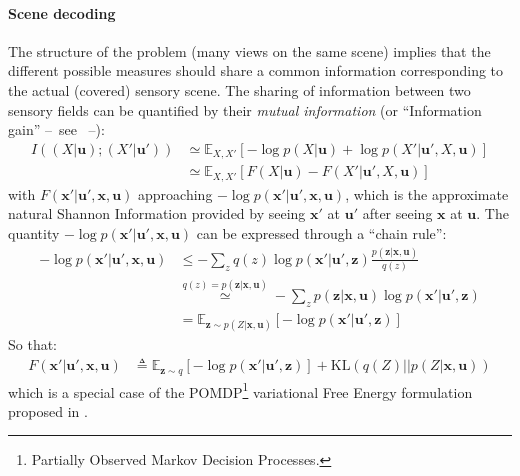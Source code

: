 \documentclass[12pt,twoside,openright]{article}
\begin{document}
\paragraph{Scene decoding}
The structure of the problem (many views on the same scene) implies that the different possible measures should share a common information corresponding to the actual (covered) sensory scene. The sharing of information between two sensory fields can be quantified by their \emph{mutual information} (or ``Information gain'' --~see \cite{tishby2011information}~--):
\begin{align}
I((X| \boldsymbol{u}); (X'| \boldsymbol{u}')) &\simeq \mathbb{E}_{X,X'} \left[-\log p(X| \boldsymbol{u}) + \log p(X'| \boldsymbol{u}', X, \boldsymbol{u})\right] \nonumber\\
&\simeq \mathbb{E}_{X,X'} \left[F(X|\boldsymbol{u}) - F(X'|\boldsymbol{u}', X, \boldsymbol{u})\right] 
\end{align}
with $F(\boldsymbol{x}'|\boldsymbol{u}', \boldsymbol{x}, \boldsymbol{u})$ approaching  $-\log p(\boldsymbol{x}'| \boldsymbol{u}', \boldsymbol{x}, \boldsymbol{u})$, which is the approximate natural Shannon Information provided by seeing $\boldsymbol{x}'$ at $\boldsymbol{u}'$ after seeing $\boldsymbol{x}$ at $\boldsymbol{u}$. The quantity $-\log p(\boldsymbol{x}'| \boldsymbol{u}', \boldsymbol{x}, \boldsymbol{u})$ can be expressed through a ``chain rule'': 
\begin{align}
-\log p(\boldsymbol{x}'| \boldsymbol{u}', \boldsymbol{x}, \boldsymbol{u}) 
&\leq - \sum_z q(z) \log p(\boldsymbol{x}'| \boldsymbol{u}', \boldsymbol{z}) \frac{p(\boldsymbol{z} |\boldsymbol{x}, \boldsymbol{u})} {q(z)}  \nonumber\\
&\stackrel{q(z) = p(\boldsymbol{z} |\boldsymbol{x}, \boldsymbol{u})}{\simeq} 
- \sum_z p(\boldsymbol{z} |\boldsymbol{x}, \boldsymbol{u}) \log p(\boldsymbol{x}'| \boldsymbol{u}', \boldsymbol{z})  \nonumber\\
&= \mathbb{E}_{\boldsymbol{z} \sim p(Z |\boldsymbol{x}, \boldsymbol{u})} \left[-\log p(\boldsymbol{x}'| \boldsymbol{u}', \boldsymbol{z})\right] 
\end{align}
So that:
\begin{align}
F(\boldsymbol{x}'|\boldsymbol{u}', \boldsymbol{x}, \boldsymbol{u}) 
&\triangleq \mathbb{E}_{\boldsymbol{z} \sim q} \left[-\log p(\boldsymbol{x}'| \boldsymbol{u}', \boldsymbol{z})\right] + \text{KL}(q(Z)||p(Z|\boldsymbol{x},\boldsymbol{u}))
\label{eq:FEP-uxu}
\end{align}
which is a special case of the POMDP\footnote{Partially Observed Markov Decision Processes.} variational Free Energy formulation proposed in \cite{friston2015active}.
\end{document}
